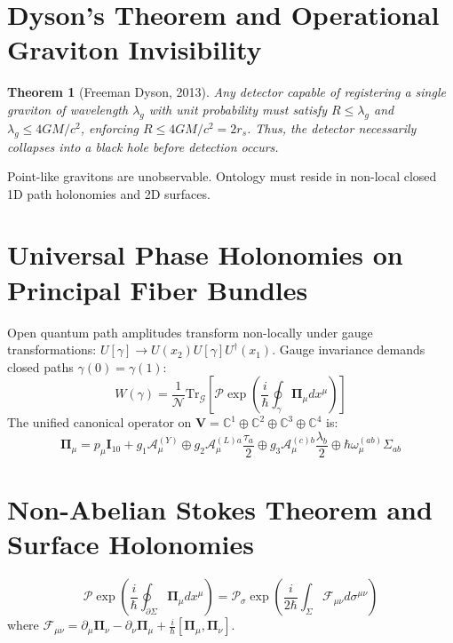 \documentclass[11pt,a4paper]{article}
\newtheorem{theorem}{Theorem}
\begin{document}
\section{Dyson's Theorem and Operational Graviton Invisibility}
\begin{theorem}[Freeman Dyson, 2013]
Any detector capable of registering a single graviton of wavelength $\lambda_g$ with unit probability must satisfy $R \le \lambda_g$ and $\lambda_g \le 4GM/c^2$, enforcing $R \le 4GM/c^2 = 2 r_s$. Thus, the detector necessarily collapses into a black hole before detection occurs.
\end{theorem}
Point-like gravitons are unobservable. Ontology must reside in non-local closed 1D path holonomies and 2D surfaces.

\section{Universal Phase Holonomies on Principal Fiber Bundles}
Open quantum path amplitudes transform non-locally under gauge transformations: $U[\gamma] \to U(x_2) U[\gamma] U^\dagger(x_1)$. Gauge invariance demands closed paths $\gamma(0) = \gamma(1)$:
\begin{equation}
W(\gamma) = \frac{1}{\mathcal{N}} \mathrm{Tr}_{\mathcal{G}} \left[ \mathcal{P} \exp \left( \frac{i}{\hbar} \oint_\gamma \mathbf{\Pi}_\mu dx^\mu \right) \right]
\end{equation}
The unified canonical operator on $\mathbf{V} = \mathbb{C}^1 \oplus \mathbb{C}^2 \oplus \mathbb{C}^3 \oplus \mathbb{C}^4$ is:
\begin{equation}
\mathbf{\Pi}_\mu = p_\mu \mathbf{I}_{10} + g_1 \mathcal{A}_\mu^{(Y)} \oplus g_2 \mathcal{A}_\mu^{(L)a}\frac{\tau_a}{2} \oplus g_3 \mathcal{A}_\mu^{(c)b}\frac{\lambda_b}{2} \oplus \hbar \omega_\mu^{(ab)}\Sigma_{ab}
\end{equation}

\section{Non-Abelian Stokes Theorem and Surface Holonomies}
\begin{equation}
\mathcal{P} \exp \left( \frac{i}{\hbar} \oint_{\partial \Sigma} \mathbf{\Pi}_\mu dx^\mu \right) = \mathcal{P}_\sigma \exp \left( \frac{i}{2\hbar} \int_\Sigma \mathcal{F}_{\mu\nu} d\sigma^{\mu\nu} \right)
\end{equation}
where $\mathcal{F}_{\mu\nu} = \partial_\mu \mathbf{\Pi}_\nu - \partial_\nu \mathbf{\Pi}_\mu + \frac{i}{\hbar}[\mathbf{\Pi}_\mu, \mathbf{\Pi}_\nu]$.
\end{document}
